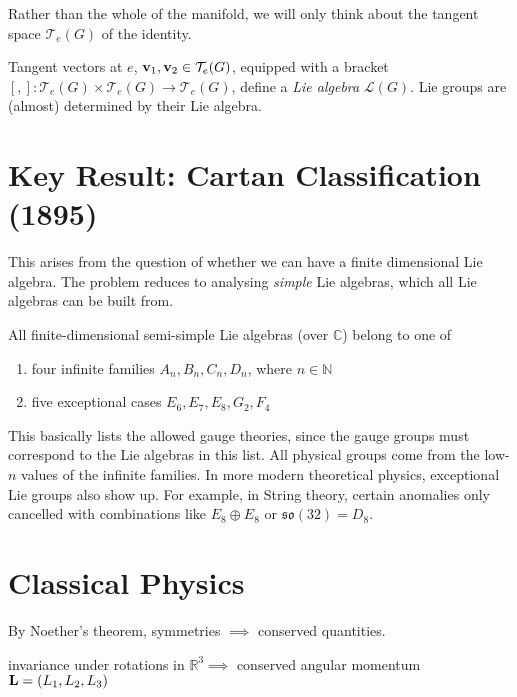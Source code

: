 Rather than the whole of the manifold, we will only think about the tangent space $\mathcal{T}_e (G)$ of the identity.

Tangent vectors at $e$, $\vb v_1, \vb v_2 \in \mathcal{T}_e (G)$, equipped with a bracket $[, ]: \mathcal{T}_e(G) \times \mathcal{T}_e(G) \rightarrow \mathcal{T}_e(G)$, define a \emph{Lie algebra} $\mathscr{L}(G)$.
Lie groups are (almost) determined by their Lie algebra.

\section{Key Result: Cartan Classification (1895)}%
\label{sec:key_result_cartan_classification}

This arises from the question of whether we can have a finite dimensional Lie algebra. The problem reduces to analysing \emph{simple} Lie algebras, which all Lie algebras can be built from.

\begin{theorem}
  All finite-dimensional semi-simple Lie algebras (over $\mathbb{C}$) belong to one of
  \begin{enumerate}
    \item four infinite families $A_n, B_n, C_{n}, D_n$, where $n \in \mathbb{N}$
    \item five exceptional cases $E_6, E_7, E_8, G_2, F_4$
  \end{enumerate}
\end{theorem}

This basically lists the allowed gauge theories, since the gauge groups must correspond to the Lie algebras in this list. All physical groups come from the low-$n$ values of the infinite families. In more modern theoretical physics, exceptional Lie groups also show up. For example, in String theory, certain anomalies only cancelled with combinations like $E_8 \oplus E_8$ or $\mathfrak{so}(32) = D_8$.

\section{Classical Physics}%
\label{sec:classical_physics}

By Noether's theorem, symmetries $\implies$ conserved quantities.

\begin{example}
  invariance under rotations in $\mathbb{R}^3 \implies$ conserved angular momentum $\vb L = (L_1, L_2, L_3)$
\end{example}

